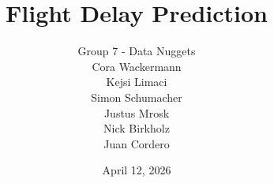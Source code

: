 \documentclass[a4paper,oneside,bibliography=totoc]{scrbook}
\begin{document}
\frontmatter \subject{Student Project} %
\title{Flight Delay Prediction}
\author{Group 7 - Data Nuggets\\
  Cora Wackermann\\
  Kejsi Limaci\\
  Simon Schumacher\\
  Justus Mrosk\\
  Nick Birkholz\\
  Juan Cordero\\} \date{April 12, 2026}
\publishers{{\small Submitted to}\\
  Data and Web Science Group\\
  Prof. Christian Bizer\\
  University of Mannheim\\}
\maketitle
\end{document}
